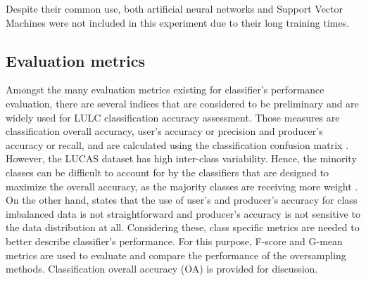 \documentclass[remotesensing,article,submit,moreauthors,pdftex]{Definitions/mdpi}
\begin{document}
Despite their common use, both artificial neural networks and Support Vector
Machines were not included in this experiment due to their long training times.

\subsection{Evaluation metrics} \label{evaluation methods}

Amongst the many evaluation metrics existing for classifier's performance
evaluation, there are several indices that are considered to be preliminary and
are widely used for LULC classification accuracy assessment. Those measures are
classification overall accuracy, user's accuracy or precision and producer's
accuracy or recall,  and are calculated using the classification confusion
matrix \cite{Liu2007}. However, the LUCAS dataset has high inter-class
variability. Hence, the minority classes can be difficult to account for by the
classifiers that are designed to maximize the overall accuracy, as the majority
classes are receiving more weight \cite{Inglada2017}. On the other hand,
\cite{He2008} states that the use of user's and producer's accuracy for class
imbalanced data is not straightforward and producer's accuracy is not sensitive
to the data distribution at all. Considering these, class specific metrics are
needed to better describe classifier's performance. For this purpose, F-score
and G-mean metrics are used to evaluate and compare the performance of the
oversampling methods. Classification overall accuracy (OA) is provided for
discussion.
\end{document}
